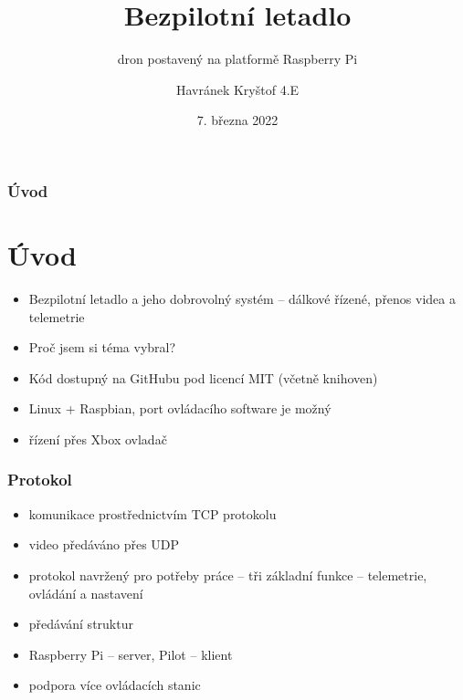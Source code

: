 \documentclass[aspectratio=43]{beamer}
\title{Bezpilotní letadlo}
\subtitle{dron postavený na platformě Raspberry Pi}
\author{Havránek Kryštof 4.E}
\date{7. března 2022}
\institute{Gymnázium, Praha 6, Arabská 14}
\begin{document}
\begin{frame}[plain]
	\maketitle
\end{frame}

\clearpage
\setcounter{framenumber}{0}

\begin{frame}[fragile]
	\frametitle{Úvod}
	\section{Úvod}

	\begin{itemize}
		\item Bezpilotní letadlo a jeho dobrovolný systém -- dálkové řízené, přenos videa a telemetrie
		\item Proč jsem si téma vybral? %
		\item Kód dostupný na GitHubu pod licencí MIT (včetně knihoven)
		\item Linux + Raspbian, port ovládacího software je možný
		\item řízení přes Xbox ovladač
	\end{itemize}
\end{frame}

\begin{frame}[fragile]
	\frametitle{Protokol}
	\begin{itemize}
		\item komunikace prostřednictvím TCP protokolu
		\item video předáváno přes UDP
		\item protokol navržený pro potřeby práce -- tři základní funkce -- telemetrie, ovládání a nastavení
		\item předávání struktur
		\item Raspberry Pi -- server, Pilot -- klient
		\item podpora více ovládacích stanic
	\end{itemize}
\end{frame}
\end{document}
